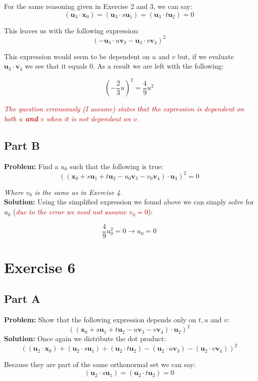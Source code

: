 \documentclass{article}
\begin{document}
For the same reasoning given in Exercise 2 and 3, we can say:
$$(\mathbf u_3\cdot\mathbf x_0)=(\mathbf u_3\cdot s\mathbf u_1)=(\mathbf u_3\cdot t\mathbf u_2)=0$$

This leaves us with the following expression:
$$(-\mathbf u_3\cdot u\mathbf v_3-\mathbf u_3\cdot v\mathbf v_4)^2$$

This expression would seem to be dependent on $u$ and $v$ but, if we evaluate $\mathbf u_3\cdot \mathbf v_4$ we see that it equals 0. As a result we are left with the following:

$$\left(-\frac{2}{3}u\right)^2=\frac{4}{9}u^2$$

\textit{\textcolor{red}{The question erroneously (I assume) states that the expression is dependent on both $u$ \textbf{and} $v$ when it is not dependent on $v$.}}

\subsection*{Part B}
\textbf{Problem:} Find a $u_0$ such that the following is true:
$$((\mathbf x_0+s\mathbf u_1+t\mathbf u_2-u_0\mathbf v_3-v_0\mathbf v_4)\cdot\mathbf u_3)^2=0$$

\textit{Where $v_0$ is the same as in Exercise 4.}
\\
\textbf{Solution:} Using the simplified expression we found above we can simply solve for $u_0$ (\textit{\textcolor{red}{due to the error we need not assume $v_0=0$}}):

$$\frac{4}{9}u_0^2=0\rightarrow \boxed{u_0=0}$$

\section*{Exercise 6}
\subsection*{Part A}
\textbf{Problem:} Show that the following expression depends only on $t,u$ and $v$:
$$((\mathbf x_0+s\mathbf u_1+t\mathbf u_2-u\mathbf v_3-v\mathbf v_4)\cdot\mathbf u_2)^2$$
\textbf{Solution:} Once again we distribute the dot product:
$$((\mathbf u_2\cdot\mathbf x_0)+(\mathbf u_2\cdot s\mathbf u_1)+(\mathbf u_2\cdot t\mathbf u_2)-(\mathbf u_2\cdot u\mathbf v_3)-(\mathbf u_2\cdot v\mathbf v_4))^2$$

Because they are part of the same orthonormal set we can say:
$$(\mathbf u_2\cdot s\mathbf u_1)=(\mathbf u_2\cdot t\mathbf u_2)=0$$
\end{document}
